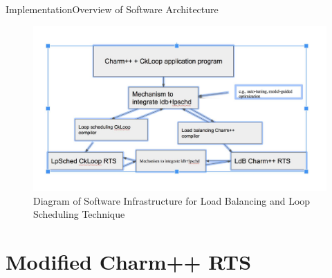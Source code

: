 
\begin{frame}{Implementation}{Overview of Software Architecture}
\begin{figure}[ht!]
\includegraphics[scale=0.4]{./images/lslb_softwarediagram}
\caption{Diagram of Software Infrastructure for Load Balancing and Loop Scheduling Technique}
\end{figure}
\end{frame}

\section{Modified Charm++ RTS}

